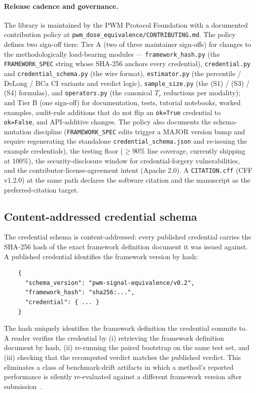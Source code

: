 \documentclass[twoside,11pt]{article}
\begin{document}
\paragraph{Release cadence and governance.} The library is maintained by the PWM Protocol Foundation with a documented contribution policy at \texttt{pwm\_dose\_equivalence/CONTRIBUTING.md}. The policy defines two sign-off tiers: Tier A (two of three maintainer sign-offs) for changes to the methodologically load-bearing modules --- \texttt{framework\_hash.py} (the \texttt{FRAMEWORK\_SPEC} string whose SHA-256 anchors every credential), \texttt{credential.py} and \texttt{credential\_schema.py} (the wire format), \texttt{estimator.py} (the percentile / DeLong / BCa CI variants and verdict logic), \texttt{sample\_size.py} (the (S1) / (S3) / (S4) formulas), and \texttt{operators.py} (the canonical $T_r$ reductions per modality); and Tier B (one sign-off) for documentation, tests, tutorial notebooks, worked examples, audit-rule additions that do not flip an \texttt{ok=True} credential to \texttt{ok=False}, and API-additive changes. The policy also documents the schema-mutation discipline (\texttt{FRAMEWORK\_SPEC} edits trigger a MAJOR version bump and require regenerating the standalone \texttt{credential\_schema.json} and re-issuing the example credentials), the testing floor ($\geq 90\%$ line coverage, currently shipping at $100\%$), the security-disclosure window for credential-forgery vulnerabilities, and the contributor-license-agreement intent (Apache 2.0). A \texttt{CITATION.cff} (CFF v1.2.0) at the same path declares the software citation and the manuscript as the preferred-citation target.

\subsection{Content-addressed credential schema}
\label{sec:anchoring}

The credential schema is content-addressed: every published credential carries the SHA-256 hash of the exact framework definition document it was issued against. A published credential identifies the framework version by hash:

\begin{verbatim}
    {
      "schema_version": "pwm-signal-equivalence/v0.2",
      "framework_hash": "sha256:...",
      "credential": { ... }
    }
\end{verbatim}

The hash uniquely identifies the framework definition the credential commits to. A reader verifies the credential by (i) retrieving the framework definition document by hash, (ii) re-running the paired bootstrap on the same test set, and (iii) checking that the recomputed verdict matches the published verdict. This eliminates a class of benchmark-drift artifacts in which a method's reported performance is silently re-evaluated against a different framework version after submission~\citep{wang2020deeplearningreview}.
\end{document}
